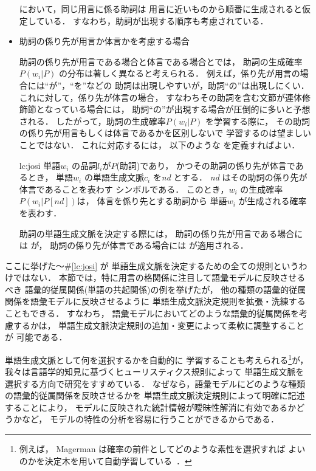 \begin{itemize}
   において，同じ用言に係る助詞は
  用言に近いものから順番に生成されると仮定している．
  すなわち，助詞が出現する順序も考慮されている．


\item 助詞の係り先が用言か体言かを考慮する場合

  助詞の係り先が用言である場合と体言である場合とでは，
  助詞の生成確率$P(w_i | P)$ の分布は著しく異なると考えられる．
  例えば，係り先が用言の場合には``が''，``を''などの
  助詞は出現しやすいが，助詞``の''は出現しにくい．
  これに対して，係り先が体言の場合，
  すなわちその助詞を含む文節が連体修飾節となっている場合には，
  助詞``の''が出現する場合が圧倒的に多いと予想される．
  したがって，助詞の生成確率$P(w_i | P)$ を学習する際に，
  その助詞の係り先が用言もしくは体言であるかを区別しないで
  学習するのは望ましいことではない．
  これに対応するには，
  以下のような を定義すればよい．

  \bigskip
  \begin{lcdef}{lc:josi}
    単語$w_i$ の品詞$l_i$が$P$(助詞)であり，
    かつその助詞の係り先が体言であるとき，
    単語$w_i$ の単語生成文脈$c_i$ を{\it nd\/} とする．
    {\it nd\/} はその助詞の係り先が体言であることを表わす
    シンボルである．
    このとき，$w_i$ の生成確率$P(w_i | P[nd])$は，
    体言を係り先とする助詞から
    単語$w_i$ が生成される確率を表わす．
  \end{lcdef}
  \bigskip
  助詞の単語生成文脈を決定する際には，
  助詞の係り先が用言である場合には が，
  助詞の係り先が体言である場合には が適用される．
\end{itemize}

ここに挙げた〜\#\ref{lc:josi} が
単語生成文脈を決定するための全ての規則というわけではない．
本節では，特に用言の格関係に注目して語彙モデルに反映させるべき
語彙的従属関係(単語の共起関係)の例を挙げたが，
他の種類の語彙的従属関係を語彙モデルに反映させるように
単語生成文脈決定規則を拡張・洗練することもできる．
すなわち，
語彙モデルにおいてどのような語彙的従属関係を考慮するかは，
単語生成文脈決定規則の追加・変更によって柔軟に調整することが
可能である．

単語生成文脈として何を選択するかを自動的に
学習することも考えられる\footnote{
  例えば，
  Magerman は確率の前件としてどのような素性を選択すれば
  よいのかを決定木を用いて自動学習している~\cite{magerman:95:a}．
  }が，
我々は言語学的知見に基づくヒューリスティクス規則によって
単語生成文脈を選択する方向で研究をすすめている．
なぜなら，語彙モデルにどのような種類の語彙的従属関係を反映させるかを
単語生成文脈決定規則によって明確に記述することにより，
モデルに反映された統計情報が曖昧性解消に有効であるかどうかなど，
モデルの特性の分析を容易に行うことができるからである．
